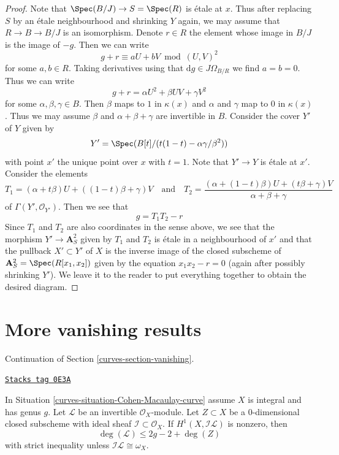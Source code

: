 \begin{proof}
\medskip\noindent
Note that $\Spec(B/J) \to S = \Spec(R)$ is \'etale at $x$.
Thus after replacing $S$ by an \'etale neighbourhood and shrinking
$Y$ again, we may assume that $R \to B \to B/J$ is an isomorphism.
Denote $r \in R$ the element whose image in $B/J$ is the image of $-g$.
Then we can write
$$
g + r \equiv a U + b V \bmod (U, V)^2
$$
for some $a, b \in R$. Taking derivatives using that
$\text{d}g \in J\Omega_{B/R}$ we find $a = b = 0$.
Thus we can write
$$
g + r = \alpha U^2 + \beta UV + \gamma V^2
$$
for some $\alpha, \beta, \gamma \in B$. Then
$\beta$ maps to $1$ in $\kappa(x)$ and $\alpha$ and $\gamma$
map to $0$ in $\kappa(x)$.
Thus we may assume $\beta$ and $\alpha + \beta + \gamma$
are invertible in $B$. Consider the cover $Y'$ of $Y$ given by
$$
Y' = \Spec(B[t]/(t(1 - t) - \alpha \gamma / \beta^2))
$$
with point $x'$ the unique point over $x$ with $t = 1$.
Note that $Y' \to Y$ is \'etale at $x'$.
Consider the elements
$$
T_1 = (\alpha + t \beta)U + ((1 - t)\beta + \gamma)V
\quad\text{and}\quad
T_2 =
\frac{(\alpha + (1 - t) \beta)U + (t\beta + \gamma)V}{\alpha + \beta + \gamma}
$$
of $\Gamma(Y', \mathcal{O}_{Y'})$. Then we see that
$$
g = T_1 T_2 - r
$$
Since $T_1$ and $T_2$ are also coordinates in the sense above,
we see that the morphism $Y' \to \mathbf{A}^2_S$ given by $T_1$ and $T_2$
is \'etale in a neighbourhood of $x'$ and that the pullback
$X' \subset Y'$ of $X$ is the inverse image of the closed subscheme
of $\mathbf{A}^2_S = \Spec(R[x_1, x_2])$ given by the equation
$x_1x_2 - r = 0$ (again after possibly shrinking $Y'$).
We leave it to the reader to put everything together to
obtain the desired diagram.
\end{proof}

\section{More vanishing results}
\label{curves-section-more-vanishing}
Continuation of Section \ref{curves-section-vanishing}.

\begin{lemma}
\label{curves-lemma-h1-nonzero-degree-leq-2g-2}
\href{https://stacks.math.columbia.edu/tag/0E3A}{\texttt{Stacks tag 0E3A}}

In Situation \ref{curves-situation-Cohen-Macaulay-curve} assume $X$ is integral and
has genus $g$. Let $\mathcal{L}$ be an invertible $\mathcal{O}_X$-module.
Let $Z \subset X$ be a $0$-dimensional closed subscheme with ideal
sheaf $\mathcal{I} \subset \mathcal{O}_X$. If $H^1(X, \mathcal{I}\mathcal{L})$
is nonzero, then
$$
\deg(\mathcal{L}) \leq 2g - 2 + \deg(Z)
$$
with strict inequality unless $\mathcal{I}\mathcal{L} \cong \omega_X$.
\end{lemma}

